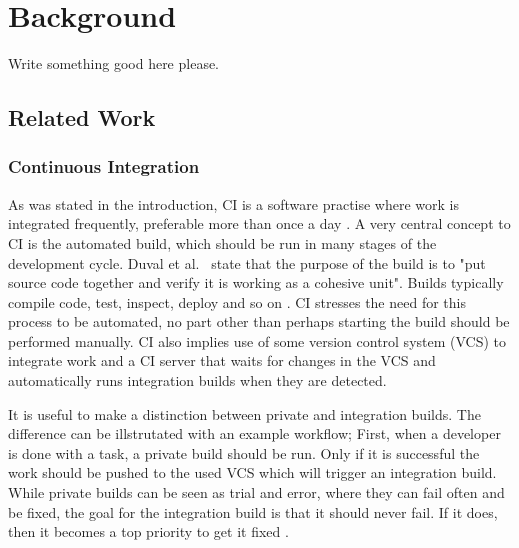 \chapter{Background}
\label{chap:background}


Write something good here please.

\section{Related Work}

\subsection{Continuous Integration}
As was stated in the introduction, CI is a software practise where work is integrated frequently, preferable more than once a day \cite{FowlerCI}. A very central concept to CI is the automated build, which should be run in many stages of the development cycle. Duval et al.\ \cite{CIbook} state that the purpose of the build is to "put source code together and verify it is working as a cohesive unit". Builds typically compile code, test, inspect, deploy and so on \cite{CIbook}. CI stresses the need for this process to be automated, no part other than perhaps starting the build should be performed manually. CI also implies use of some version control system (VCS) to integrate work and a CI server that waits for changes in the VCS and automatically runs integration builds when they are detected.

It is useful to make a distinction between private and integration builds. The difference can be illstrutated with an example workflow;
First, when a developer is done with a task, a private build should be run. Only if it is successful the work should be pushed to the used VCS which will trigger an integration build. While private builds can be seen as trial and error, where they can fail often and be fixed, the goal for the integration build is that it should never fail. If it does, then it becomes a top priority to get it fixed \cite{FowlerCI}.

